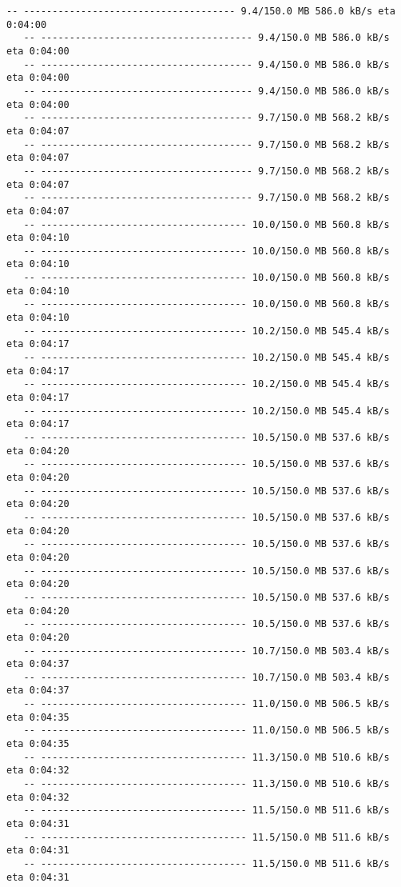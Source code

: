 \documentclass[11pt]{article}
\begin{document}
\begin{Verbatim}[commandchars=\\\{\}]
   -- ------------------------------------- 9.4/150.0 MB 586.0 kB/s eta 0:04:00
   -- ------------------------------------- 9.4/150.0 MB 586.0 kB/s eta 0:04:00
   -- ------------------------------------- 9.4/150.0 MB 586.0 kB/s eta 0:04:00
   -- ------------------------------------- 9.4/150.0 MB 586.0 kB/s eta 0:04:00
   -- ------------------------------------- 9.7/150.0 MB 568.2 kB/s eta 0:04:07
   -- ------------------------------------- 9.7/150.0 MB 568.2 kB/s eta 0:04:07
   -- ------------------------------------- 9.7/150.0 MB 568.2 kB/s eta 0:04:07
   -- ------------------------------------- 9.7/150.0 MB 568.2 kB/s eta 0:04:07
   -- ------------------------------------ 10.0/150.0 MB 560.8 kB/s eta 0:04:10
   -- ------------------------------------ 10.0/150.0 MB 560.8 kB/s eta 0:04:10
   -- ------------------------------------ 10.0/150.0 MB 560.8 kB/s eta 0:04:10
   -- ------------------------------------ 10.0/150.0 MB 560.8 kB/s eta 0:04:10
   -- ------------------------------------ 10.2/150.0 MB 545.4 kB/s eta 0:04:17
   -- ------------------------------------ 10.2/150.0 MB 545.4 kB/s eta 0:04:17
   -- ------------------------------------ 10.2/150.0 MB 545.4 kB/s eta 0:04:17
   -- ------------------------------------ 10.2/150.0 MB 545.4 kB/s eta 0:04:17
   -- ------------------------------------ 10.5/150.0 MB 537.6 kB/s eta 0:04:20
   -- ------------------------------------ 10.5/150.0 MB 537.6 kB/s eta 0:04:20
   -- ------------------------------------ 10.5/150.0 MB 537.6 kB/s eta 0:04:20
   -- ------------------------------------ 10.5/150.0 MB 537.6 kB/s eta 0:04:20
   -- ------------------------------------ 10.5/150.0 MB 537.6 kB/s eta 0:04:20
   -- ------------------------------------ 10.5/150.0 MB 537.6 kB/s eta 0:04:20
   -- ------------------------------------ 10.5/150.0 MB 537.6 kB/s eta 0:04:20
   -- ------------------------------------ 10.5/150.0 MB 537.6 kB/s eta 0:04:20
   -- ------------------------------------ 10.7/150.0 MB 503.4 kB/s eta 0:04:37
   -- ------------------------------------ 10.7/150.0 MB 503.4 kB/s eta 0:04:37
   -- ------------------------------------ 11.0/150.0 MB 506.5 kB/s eta 0:04:35
   -- ------------------------------------ 11.0/150.0 MB 506.5 kB/s eta 0:04:35
   -- ------------------------------------ 11.3/150.0 MB 510.6 kB/s eta 0:04:32
   -- ------------------------------------ 11.3/150.0 MB 510.6 kB/s eta 0:04:32
   -- ------------------------------------ 11.5/150.0 MB 511.6 kB/s eta 0:04:31
   -- ------------------------------------ 11.5/150.0 MB 511.6 kB/s eta 0:04:31
   -- ------------------------------------ 11.5/150.0 MB 511.6 kB/s eta 0:04:31

\end{Verbatim}
\end{document}
